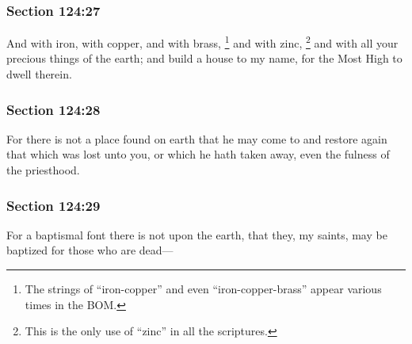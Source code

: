 	\subsubsection{Section 124:27} %
		\label{DC124-27}

		And with iron, with copper, and with brass,%
			\footnote{%
				The strings of ``iron-copper'' and even ``iron-copper-brass'' appear various times in the BOM.
				}
		and with zinc,%
			\footnote{%
				This is the only use of ``zinc'' in all the scriptures.
				}
		and with all your precious things of the earth; and build a house to my name, for the Most High to dwell therein.


	\subsubsection{Section 124:28} %
		\label{DC124-28}

		For there is not a place found on earth that he may come to and restore again that which was lost unto you, or which he hath taken away, even the fulness of the priesthood.


	\subsubsection{Section 124:29} %
		\label{DC124-29}

		For a baptismal font there is not upon the earth, that they, my saints, may be baptized for those who are dead---

